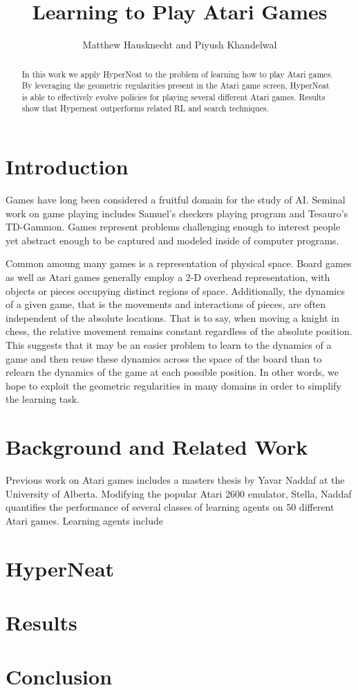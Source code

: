 \documentclass{article}
\begin{document}
\title{Learning to Play Atari Games}
\author{Matthew Hausknecht and Piyush Khandelwal}

\maketitle

\begin{abstract}
In this work we apply HyperNeat to the problem of learning how to play Atari games. By leveraging the geometric regularities present in the Atari game screen, HyperNeat is able to effectively evolve policies for playing several different Atari games. Results show that Hyperneat outperforms related RL and search techniques.
\end{abstract}

\section{Introduction}
Games have long been considered a fruitful domain for the study of AI. Seminal work on game playing includes Samuel's checkers playing program\cite{samuel_59} and Tesauro's TD-Gammon\cite{tesauro_94}. Games represent problems challenging enough to interest people yet abstract enough to be captured and modeled inside of computer programs. 

Common amoung many games is a representation of physical space. Board games as well as Atari games generally employ a 2-D overhead representation, with objects or pieces occupying distinct regions of space. Additionally, the dynamics of a given game, that is the movements and interactions of pieces, are often independent of the absolute locations. That is to say, when moving a knight in chess, the relative movement remains constant regardless of the absolute position. This suggests that it may be an easier problem to learn to the dynamics of a game and then reuse these dynamics across the space of the board than to relearn the dynamics of the game at each possible position. In other words, we hope to exploit the geometric regularities in many domains in order to simplify the learning task.

\section{Background and Related Work}
Previous work on Atari games includes a masters thesis by Yavar Naddaf\cite{naddaf10} at the University of Alberta. Modifying the popular Atari 2600 emulator, Stella, Naddaf quantifies the performance of several classes of learning agents on 50 different Atari games. Learning agents include 

\section{HyperNeat}

\section{Results}

\section{Conclusion}


	

\end{document}
